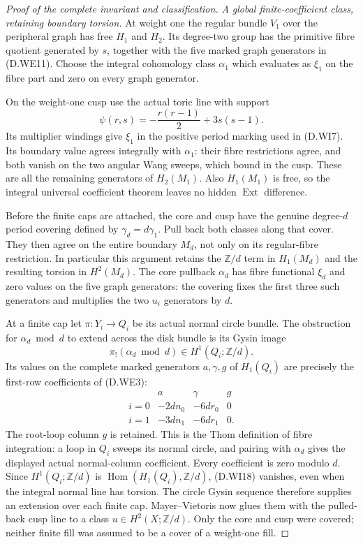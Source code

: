 \begin{proof}[Proof of the complete invariant and classification]
\emph{A global finite-coefficient class, retaining boundary torsion.}
At weight one the regular bundle $V_1$ over the peripheral
graph has free $H_1$ and $H_2$. Its degree-two group has the
primitive fibre quotient generated by $s$, together with the
five marked graph generators in (D.WE11). Choose the integral
cohomology class $\alpha_1$ which evaluates as $\xi_1$ on the
fibre part and zero on every graph generator.

On the weight-one cusp use the actual toric line with support
\[
                 \psi(r,s)=-\frac{r(r-1)}2+3s(s-1).
 \tag{D.WI17}
\]
Its multiplier windings give $\xi_1$ in the positive period
marking used in (D.WI7). Its boundary value agrees integrally
with $\alpha_1$: their fibre restrictions agree, and both
vanish on the two angular Wang sweeps, which bound in the
cusp. These are all the remaining generators of $H_2(M_1)$.
Also $H_1(M_1)$ is free, so the integral universal coefficient
theorem leaves no hidden $\operatorname{Ext}$ difference.

Before the finite caps are attached, the core and cusp have
the genuine degree-$d$ period covering defined by
$\gamma_d=d\gamma_1$. Pull back both classes along that
cover. They then agree on the entire boundary $M_d$, not
only on its regular-fibre restriction. In particular this
argument retains the $\mathbb Z/d$ term in $H_1(M_d)$ and
the resulting torsion in $H^2(M_d)$. The core pullback
$\alpha_d$ has fibre functional $\xi_d$ and zero values on
the five graph generators: the covering fixes the first
three such generators and multiplies the two $u_i$ generators
by $d$.

At a finite cap let $\pi:Y_i\longrightarrow Q_i$ be its
actual normal circle bundle. The obstruction for
$\alpha_d\bmod d$ to extend across the disk bundle is its
Gysin image
\[
                  \pi_!(\alpha_d\bmod d)\in
                         H^1(Q_i;\mathbb Z/d).
 \tag{D.WI18}
\]
Its values on the complete marked generators
$a,\gamma,g$ of $H_1(Q_i)$ are precisely the first-row
coefficients of (D.WE3):
\[
 \begin{array}{c|ccc}
       &a&\gamma&g\\ \hline
 i=0&-2dn_0&-6dr_0&0\\
 i=1&-3dn_1&-6dr_1&0.
 \end{array}
 \tag{D.WI19}
\]
The root-loop column $g$ is retained. This is the Thom
definition of fibre integration: a loop in $Q_i$ sweeps its
normal circle, and pairing with $\alpha_d$ gives the displayed
actual normal-column coefficient. Every coefficient is zero
modulo $d$. Since $H^1(Q_i;\mathbb Z/d)$ is
$\operatorname{Hom}(H_1(Q_i),\mathbb Z/d)$, (D.WI18) vanishes,
even when the integral normal line has torsion. The circle
Gysin sequence therefore supplies an extension over each
finite cap. Mayer--Vietoris now glues them with the pulled-back
cusp line to a class $u\in H^2(X;\mathbb Z/d)$.
Only the core and cusp were covered; neither finite fill was
assumed to be a cover of a weight-one fill.


\end{proof}
